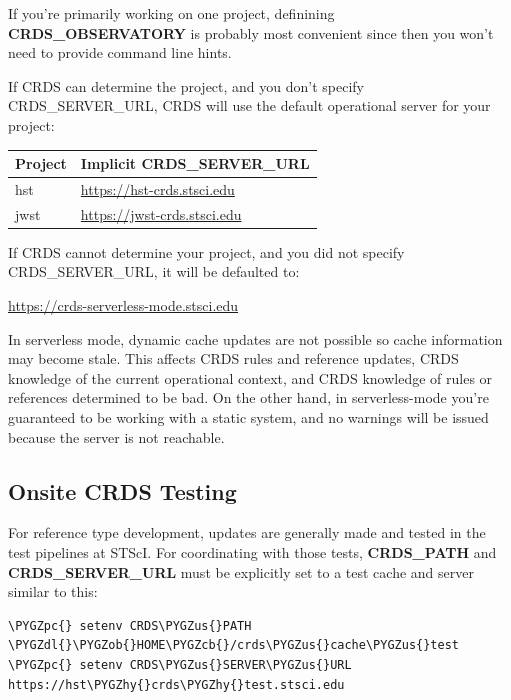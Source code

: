 \documentclass[letterpaper,10pt,english]{sphinxmanual}
\def\PYGZus{\char`\_}
\def\PYGZob{\char`\{}
\def\PYGZcb{\char`\}}
\def\PYGZpc{\char`\%}
\def\PYGZdl{\char`\$}
\def\PYGZhy{\char`\-}
\begin{document}
If you're primarily working on one project,  definining \textbf{CRDS\_OBSERVATORY} is probably most convenient
since then you won't need to provide command line hints.

If CRDS can determine the project,  and you don't specify CRDS\_SERVER\_URL,  CRDS will use the default
operational server for your project:

\begin{tabulary}{\linewidth}{|L|L|}
\hline
\textsf{\relax 
Project
} & \textsf{\relax 
Implicit CRDS\_SERVER\_URL
}\\
\hline
hst
 & 
\href{https://hst-crds.stsci.edu}{https://hst-crds.stsci.edu}
\\

jwst
 & 
\href{https://jwst-crds.stsci.edu}{https://jwst-crds.stsci.edu}
\\
\hline\end{tabulary}


If CRDS cannot determine your project,  and you did not specify CRDS\_SERVER\_URL,  it will be defaulted to:

\href{https://crds-serverless-mode.stsci.edu}{https://crds-serverless-mode.stsci.edu}

In serverless mode, dynamic cache updates are not possible so cache information may become stale.  This affects CRDS
rules and reference updates,  CRDS knowledge of the current operational context, and CRDS knowledge of rules or
references determined to be bad.   On the other hand,  in serverless-mode you're guaranteed to be working with
a static system, and no warnings will  be issued because the server is not reachable.


\subsection{Onsite CRDS Testing}
\label{installation:onsite-crds-testing}
For reference type development,  updates are generally made and tested in the test pipelines at STScI.  For
coordinating with those tests,  \textbf{CRDS\_PATH} and \textbf{CRDS\_SERVER\_URL} must be explicitly set to a test cache and server
similar to this:

\begin{Verbatim}[commandchars=\\\{\}]
\PYGZpc{} setenv CRDS\PYGZus{}PATH  \PYGZdl{}\PYGZob{}HOME\PYGZcb{}/crds\PYGZus{}cache\PYGZus{}test
\PYGZpc{} setenv CRDS\PYGZus{}SERVER\PYGZus{}URL https://hst\PYGZhy{}crds\PYGZhy{}test.stsci.edu
\end{Verbatim}
\end{document}
